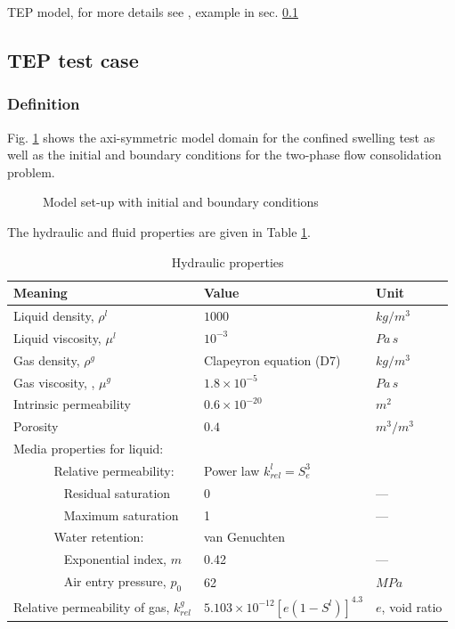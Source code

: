 TEP model, for more details see \cite{WanEtAl:2008b},
example in sec. \ref{sec:tep}

\subsection{TEP test case}
\label{sec:tep}

\subsubsection{Definition}

Fig. \ref{fig_aximodel} shows the axi-symmetric model domain for the confined swelling test as well as the initial and boundary conditions for the two-phase flow consolidation problem.
\begin{figure}[H]
\centering

\caption{Model set-up with initial and boundary conditions}
\label{fig_aximodel}
\end{figure}

The hydraulic and fluid properties are given in Table \ref{tab:hydromat}.
\begin{table}[!htb]
\centering
\begin{tabular}{lll}
\hline\noalign{\smallskip}
\hline
Meaning & Value & Unit \\
\hline
Liquid density, $\rho^l$ & $1000$ & $kg/m^3$\\
Liquid viscosity, $\mu^l$ &$10^{-3}$ & $Pa\,s$\\
Gas density,  $\rho^g$ & Clapeyron equation (D7) &$kg/m^3$\\
Gas viscosity, , $\mu^g$ &$1.8\times10^{-5}$ & $Pa\,s$\\
\hline
Intrinsic permeability & $0.6\times10^{-20}$ & $m^2$\\
Porosity & $0.4$ & $m^3/m^3$ \\
\hline
Media properties for liquid: &  & \\
$\phantom{Relativ}$Relative permeability: & Power law $k_{rel}^l=S_e^3$  & \\
$\phantom{Relative}$ Residual saturation & 0 &--- \\
$\phantom{Relative}$ Maximum saturation & 1 &--- \\
$\phantom{Relativ}$Water retention: & van Genuchten  & \\
$\phantom{Relative}$ Exponential index, $m$ & 0.42 &--- \\
$\phantom{Relative}$ Air entry pressure, $p_0$& 62 &$MPa$ \\
\hline
Relative permeability of gas, $k_{rel}^g$ & $5.103\times10^{-12}\left[e(1-S^l)\right]^{4.3}$ & $e$, void ratio\\
\hline\hline
\end{tabular}
\caption{Hydraulic properties} %
\label{tab:hydromat}
\end{table}

